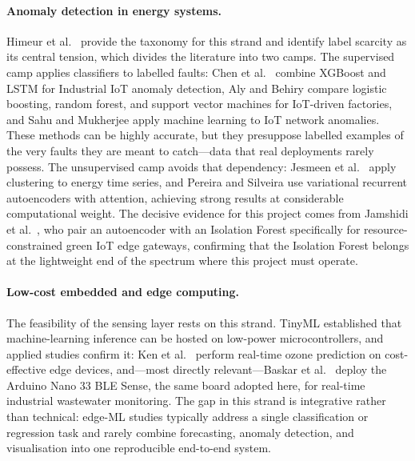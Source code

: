 \documentclass[11pt,a4paper]{article}
\begin{document}
\paragraph{Anomaly detection in energy systems.}
Himeur et al.\ \cite{himeur2021artificial} provide the taxonomy for this strand
and identify label scarcity as its central tension, which divides the literature
into two camps. The supervised camp applies classifiers to labelled faults: Chen
et al.\ \cite{chen2024effective} combine XGBoost and LSTM for Industrial IoT
anomaly detection, Aly and Behiry \cite{aly2025enhancing} compare logistic
boosting, random forest, and support vector machines for IoT-driven factories,
and Sahu and Mukherjee \cite{sahu2020machine} apply machine learning to IoT
network anomalies. These methods can be highly accurate, but they presuppose
labelled examples of the very faults they are meant to catch---data that real
deployments rarely possess. The unsupervised camp avoids that dependency:
Jesmeen et al.\ \cite{jesmeen2021unsupervised} apply clustering to energy time
series, and Pereira and Silveira \cite{pereira2018unsupervised} use variational
recurrent autoencoders with attention, achieving strong results at considerable
computational weight. The decisive evidence for this project comes from Jamshidi
et al.\ \cite{jamshidi2025lightweight}, who pair an autoencoder with an
Isolation Forest specifically for resource-constrained green IoT edge gateways,
confirming that the Isolation Forest belongs at the lightweight end of the
spectrum where this project must operate.

\paragraph{Low-cost embedded and edge computing.}
The feasibility of the sensing layer rests on this strand. TinyML
\cite{warden2019tinyml} established that machine-learning inference can be
hosted on low-power microcontrollers, and applied studies confirm it: Ken et
al.\ \cite{ken2024advancing} perform real-time ozone prediction on
cost-effective edge devices, and---most directly relevant---Baskar et al.\
\cite{baskar2024edge} deploy the Arduino Nano 33 BLE Sense, the same board adopted
here, for real-time industrial wastewater monitoring. The gap in this strand is
integrative rather than technical: edge-ML studies typically address a single
classification or regression task and rarely combine forecasting, anomaly
detection, and visualisation into one reproducible end-to-end system.
\end{document}

